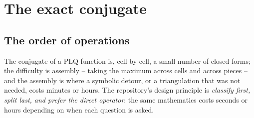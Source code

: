 \documentclass[11pt]{article}
\theoremstyle{definition}
\begin{document}
\section{The exact conjugate}

\subsection{The order of operations}

The conjugate of a PLQ function is, cell by cell, a small number of closed
forms; the difficulty is assembly -- taking the maximum across cells and
across pieces -- and the assembly is where a symbolic detour, or a triangulation
that was not needed, costs minutes or hours. The repository's design principle
is \emph{classify first, split last, and prefer the direct operator}: the same
mathematics costs seconds or hours depending on when each question is asked.
\end{document}
